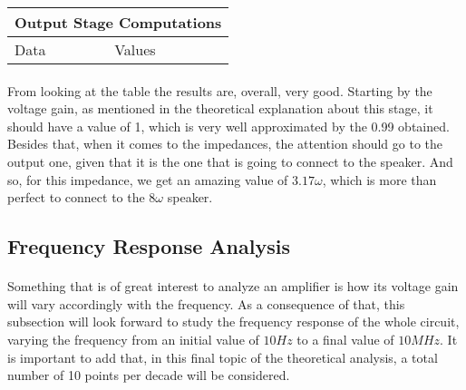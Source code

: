 \begin{table}[H]
\centering
\begin{tabular}{|l|l|} 
\hline
\multicolumn{2}{|l|}{\textbf{Output Stage Computations}}  \\ 
\hline
Data             & Values                               \\ 
\hline
        
\end{tabular}
\end{table}

\paragraph{}From looking at the table the results are, overall, very good. Starting by the voltage gain, as mentioned in the theoretical explanation about this stage, it should have a value of 1, which is very well approximated by the 0.99 obtained. Besides that, when it comes to the impedances, the attention should go to the output one, given that it is the one that is going to connect to the speaker. And so, for this impedance, we get an amazing value of $3.17 \omega$, which is more than perfect to connect to the $8\omega$ speaker.






\subsection{Frequency Response Analysis}

\paragraph{}Something that is of great interest to analyze an amplifier is how its voltage gain will vary accordingly with the frequency. As a consequence of that, this subsection will look forward to study the frequency response of the whole circuit, varying the frequency from an initial value of $10 Hz$ to a final value of $10 MHz$. It is important to add that, in this final topic of the theoretical analysis, a total number of 10 points per decade will be considered.
